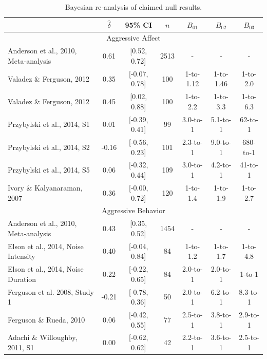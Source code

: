 \documentclass[man]{apa6}
\begin{document}
\begin{table}
\caption{Bayesian re-analysis of claimed null results.}
\begin{tabular}{lcccccc}
&$\hat{\delta}$   &95\% CI&$n$  &$B_{01}$ & $B_{02}$ &$B_{03}$ \\ \hline
\multicolumn{7}{c}{Aggressive Affect}\\
Anderson et al., 2010, Meta-analysis&0.61&[0.52, 0.72]&2513&-&-&- \\
\hspace{.2in} Valadez \& Ferguson, 2012&0.35&[-0.07, 0.78]&100&1-to-1.12&1-to-1.46&1-to-2.0 \\ %
\hspace{.2in} Valadez \& Ferguson, 2012&0.45&[0.02, 0.88]&100&1-to-2.2&1-to-3.3&1-to-6.3 \\ %
\hspace{.2in} Przybylski et al., 2014, S1&0.01&[-0.39, 0.41]&99&3.0-to-1&5.1-to-1&62-to-1 \\
\hspace{.2in} Przybylski et al., 2014, S2&-0.16&[-0.56, 0.23]&101&2.3-to-1&9.0-to-1&680-to-1 \\ %
\hspace{.2in} Przybylski et al., 2014, S5&0.06&[-0.32, 0.44]&109&3.0-to-1&4.2-to-1&41-to-1 \\
\hspace{.2in} Ivory \& Kalyanaraman, 2007&0.36&[-0.00, 0.72]&120&1-to-1.4&1-to-1.9&1-to-2.7 \\
\multicolumn{7}{c}{Aggressive Behavior}\\
Anderson et al., 2010, Meta-analysis&0.43&[0.35, 0.52]&1454&-&-&- \\
\hspace{.2in} Elson et al., 2014, Noise Intensity&0.40&[-0.04, 0.84]&84&1-to-1.2&1-to-1.7&1-to-4.8 \\
\hspace{.2in} Elson et al., 2014, Noise Duration&0.22&[-0.22, 0.65]&84&2.0-to-1&2.0-to-1&1-to-1 \\
\hspace{.2in} Ferguson et al. 2008, Study 1 &-0.21&[-0.78, 0.36]&50&2.0-to-1&6.2-to-1&8.3-to-1 \\ %
\hspace{.2in} Ferguson \& Rueda, 2010 &0.06&[-0.42, 0.55]&77&2.5-to-1&3.8-to-1&2.9-to-1 \\
\hspace{.2in} Adachi \& Willoughby, 2011, S1&0.00&[-0.62, 0.62]&42&2.2-to-1&3.6-to-1&2.5-to-1 \\

\end{tabular}
\end{table}
\end{document}
